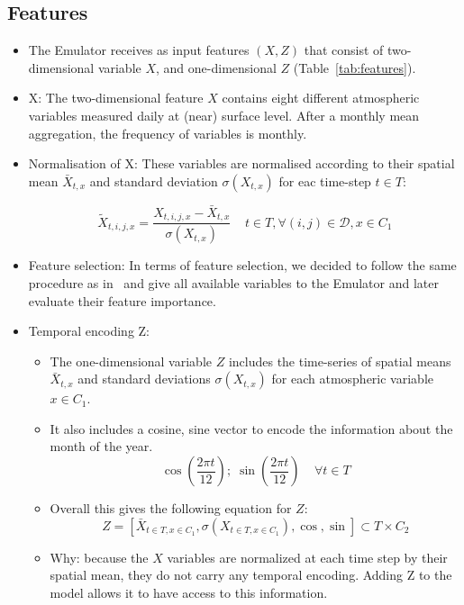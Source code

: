 \documentclass[a4paper,11pt,oneside]{report}
\begin{document}
\subsection{Features}\label{subsec:features}
\begin{itemize}
    \item The Emulator receives as input features $(X, Z)$ that consist of two-dimensional variable $X$, and one-dimensional $Z$ (Table~\ref{tab:features}). 
    \item X: The two-dimensional feature $X$ contains eight different atmospheric variables measured daily at (near) surface level. After a monthly mean aggregation, the frequency of variables is monthly.
    \item Normalisation of X: These variables are normalised according to their spatial mean $\bar{X}_{t,x}$ and standard deviation $\sigma(X_{t,x})$ for eac time-step $t\in T$:
    
    \begin{equation}\label{eq:normalisation-X}
    \tilde{X}_{t,i,j,x} = \frac{X_{t,i,j,x}-\bar{X}_{t,x}}{\sigma(X_{t,x})} \;\;\;\; t\in T, \forall (i,j) \in \mathcal{D}, x\in C_1
\end{equation}
    \item Feature selection: In terms of feature selection, we decided to follow the same procedure as in~\cite{Doury} and give all available variables to the Emulator and later evaluate their feature importance. 
    
\item Temporal encoding Z: \begin{itemize}
    \item 
The one-dimensional variable $Z$ includes the time-series of spatial means $\bar{X}_{t,x}$ and standard deviations $\sigma(X_{t,x})$ for each atmospheric variable $x\in C_1$.

\item It also includes a cosine, sine vector to encode the information about the month of the year.
    \begin{equation*}
       \operatorname{cos}\left(\frac{2\pi t}{12}\right);\; \operatorname{sin}\left(\frac{2\pi t}{12}\right) \;\;\;\; \forall t\in T
    \end{equation*}
    
    \item Overall this gives the following equation for $Z$:
    \begin{equation}\label{eq:Z}
    Z = \left[ \bar{X}_{t\in T, x\in C_1}, \sigma\left(X_{t\in T, x\in C_1}\right), \operatorname{cos}, \operatorname{sin} \right] \subset T \times C_2
\end{equation}
    \item Why: because the $X$ variables are normalized at each time step by their spatial mean, they do not carry any temporal encoding. Adding Z to the model allows it to have access to this information. 
    


\end{itemize}
\end{itemize}
\end{document}

